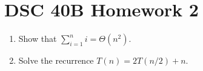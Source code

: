 \documentclass{article}
\begin{document}
\section*{DSC 40B Homework 2}
\begin{enumerate}
  \item Show that $\sum_{i=1}^{n} i = \Theta(n^2)$.
  \item Solve the recurrence $T(n) = 2T(n/2) + n$.
\end{enumerate}
\end{document}
